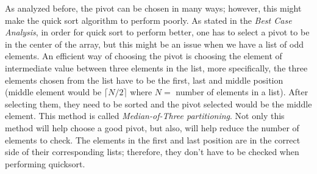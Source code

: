 \documentclass{article}
\begin{document}
As analyzed before, the pivot can be chosen in many ways; however, this 
might make the quick sort algorithm to perform poorly. As stated in the 
\emph{Best Case Analysis}, in order for quick sort to perform better, 
one has to select a pivot to be in the center of the array, but this 
might be an issue when we have a list of odd elements. 
An efficient way of choosing the pivot is choosing the element of 
intermediate value between three elements in the list, more
specifically, 
the three elements chosen from
the list have to be the first, last and middle position (middle
element would be $\lceil N/2 \rceil$ where $N =$ number of elements in a 
list). After selecting them, they need to be sorted and the pivot
selected 
would be the middle element. This method is called \emph{Median-of-Three
partitioning}. Not only this method will help choose a good pivot, but
also, will help reduce the number of elements to check. The elements in
the
first and last position are in the correct side of their corresponding
lists; therefore, they don't have to be checked when performing
quicksort.\\
\end{document}

